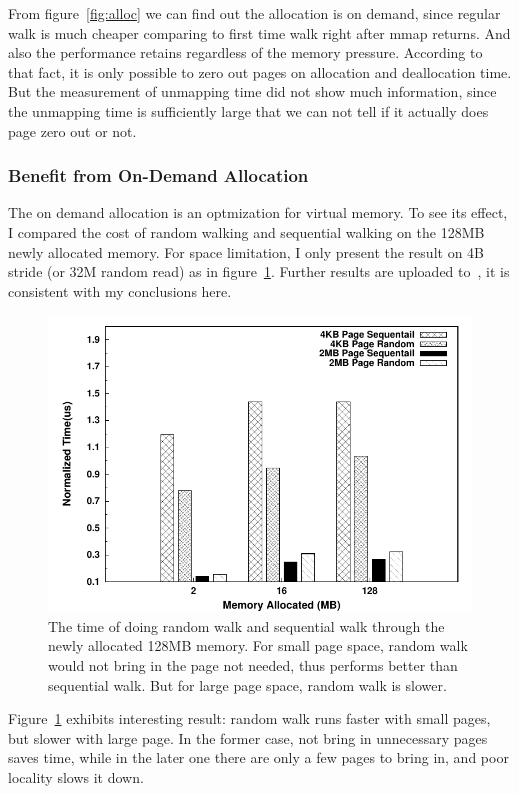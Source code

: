 From figure~\ref{fig:alloc} we can find out the allocation is on demand, since
regular walk is much cheaper comparing to first time walk right after mmap
returns. And also the performance retains regardless of the memory pressure.
According to that fact, it is only possible to zero out pages on allocation
and deallocation time. But the measurement of unmapping time did not show much
information, since the unmapping time is sufficiently large that we can not
tell if it actually does page zero out or not.

\subsubsection{Benefit from On-Demand Allocation}

The on demand allocation is an optmization for virtual memory. To see its
effect, I compared the cost of random walking and sequential walking on the
128MB newly allocated memory. For space limitation, I only present the result
on 4B stride (or 32M random read) as in figure~\ref{fig:on-demand}. Further
results are uploaded to~\cite{github}, it is consistent with my conclusions
here.

\begin{figure}[htb]
\centering
\includegraphics[width=0.9\linewidth]{../figures/on_demand_4k}
\caption{The time of doing random walk and sequential walk through the 
newly allocated 128MB memory. For small page space, random walk would not bring
in the page not needed, thus performs better than sequential walk. But for
large page space, random walk is slower.}
\label{fig:on-demand}
\end{figure}

Figure~\ref{fig:on-demand} exhibits interesting result: random walk runs
faster with small pages, but slower with large page. In the former case,
not bring in unnecessary pages saves time, while in the later one there
are only a few pages to bring in, and poor locality slows it down.

